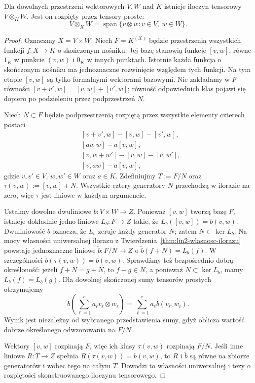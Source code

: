 \begin{twierdzenie}
\label{thm:lin9-istnienie}
Dla dowolnych przestrzeni wektorowych
\(V,W\) nad \(K\) istnieje
iloczyn tensorowy \(V\otimes_KW\).
Jest on rozpięty przez tensory proste:
\[
 V\otimes_KW=
 \operatorname{span}
 \{v\otimes w:v\in V,\ w\in W\}.
\]
\end{twierdzenie}
\begin{proof}
Oznaczmy \(X=V\times W\).
Niech \(F=K^{(X)}\) będzie przestrzenią
wszystkich funkcji \(f\colon X\to K\)
o skończonym nośniku.
Jej bazę stanowią funkcje
\([v,w]\), równe \(1_K\) w punkcie
\((v,w)\) i \(0_K\) w innych punktach.
Istotnie każda funkcja o skończonym
nośniku ma jednoznaczne rozwinięcie
względem tych funkcji.
Na tym etapie \([v,w]\) są tylko
formalnymi wektorami bazowymi.
Nie zakładamy w \(F\) równości
\([v+v',w]=[v,w]+[v',w]\);
równość odpowiednich klas
pojawi się dopiero po podzieleniu
przez podprzestrzeń \(N\).

Niech \(N\subset F\) będzie
podprzestrzenią rozpiętą przez
wszystkie elementy czterech postaci
\[
 \begin{aligned}
 &[v+v',w]-[v,w]-[v',w],\\
 &[av,w]-a[v,w],\\
 &[v,w+w']-[v,w]-[v,w'],\\
 &[v,aw]-a[v,w],
 \end{aligned}
\]
gdzie \(v,v'\in V\), \(w,w'\in W\)
oraz \(a\in K\).
Zdefiniujmy
\(T:=F/N\) oraz
\(\tau(v,w):=[v,w]+N\).
Wszystkie cztery generatory \(N\)
przechodzą w ilorazie na zero,
więc \(\tau\) jest liniowe
w każdym argumencie.

Ustalmy dowolne dwuliniowe
\(b\colon V\times W\to Z\).
Ponieważ \([v,w]\) tworzą bazę \(F\),
istnieje dokładnie jedno liniowe
\(L_b\colon F\to Z\) takie, że
\(L_b([v,w])=b(v,w)\).
Dwuliniowość \(b\) oznacza,
że \(L_b\) zeruje każdy generator \(N\);
zatem \(N\subset\ker L_b\).
Na mocy własności uniwersalnej
ilorazu z
Twierdzenia~\ref{thm:lin2-wlasnosc-ilorazu}
powstaje jednoznaczne liniowe
\(\widetilde b\colon F/N\to Z\)
o \(\widetilde b(f+N)=L_b(f)\).
W szczególności
\(\widetilde b(\tau(v,w))=b(v,w)\).
Sprawdźmy też bezpośrednio
dobrą określoność: jeżeli
\(f+N=g+N\), to \(f-g\in N\),
a ponieważ \(N\subset\ker L_b\),
mamy \(L_b(f)=L_b(g)\).
Dla dowolnej skończonej sumy
tensorów prostych otrzymujemy
\[
 \widetilde b\left(
   \sum_{\ell=1}^{r}a_\ell
    v_\ell\otimes w_\ell\right)
 =\sum_{\ell=1}^{r}
     a_\ell b(v_\ell,w_\ell).
\]
Wynik jest niezależny od
wybranego przedstawienia sumy,
gdyż oblicza wartość
dobrze określonego
odwzorowania na \(F/N\).

Wektory \([v,w]\) rozpinają \(F\),
więc ich klasy \(\tau(v,w)\)
rozpinają \(F/N\).
Jeśli inne liniowe \(R\colon T\to Z\)
spełnia \(R(\tau(v,w))=b(v,w)\),
to \(R\) i \(\widetilde b\)
są równe na zbiorze generatorów
i wobec tego na całym \(T\).
Dowodzi to własności uniwersalnej
i tezy o rozpiętości skonstruowanego
iloczynu tensorowego.
\end{proof}

